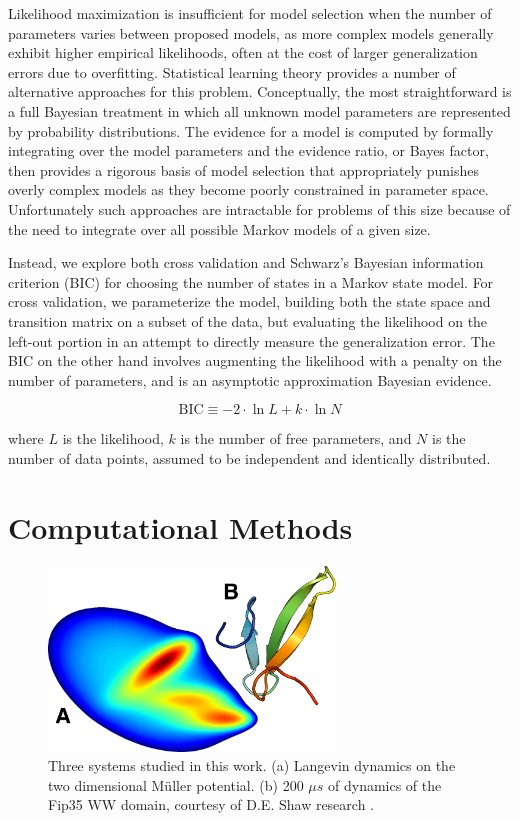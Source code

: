 \documentclass[twocolumn,floatfix,nofootinbib,aps]{revtex4-1}
\begin{document}
Likelihood maximization is insufficient for model selection when the number of parameters varies between proposed models, as more complex models generally exhibit higher empirical likelihoods, often at the cost of larger generalization errors due to overfitting\cite{Liddle2007Information, Hastie01Elements}. Statistical learning theory provides a number of alternative approaches for this problem. Conceptually, the most straightforward is a full Bayesian treatment in which all unknown model parameters are represented by probability distributions. The evidence for a model is computed by formally integrating over the model parameters and the evidence ratio, or Bayes factor\cite{Gelfand94Bayesian}, then provides a rigorous basis of model selection that appropriately punishes overly complex models as they become poorly constrained in parameter space. Unfortunately such approaches are intractable for problems of this size because of the need to integrate over all possible Markov models of a given size.

Instead, we explore both cross validation and Schwarz's Bayesian information criterion (BIC)\cite{Schwartz78Estimating} for choosing the number of states in a Markov state model. For cross validation, we parameterize the model, building both the state space and transition matrix on a subset of the data, but evaluating the likelihood on the left-out portion in an attempt to directly measure the generalization error. The BIC on the other hand involves augmenting the likelihood with a penalty on the number of parameters, and is
an asymptotic approximation Bayesian evidence.

\begin{equation}
\label{eq:bic}
\mathrm{BIC} \equiv -2\cdot \ln L + k \cdot \ln N
\end{equation}

where $L$ is the likelihood, $k$ is the number of free parameters, and $N$ is the number of data points, assumed to be independent and identically distributed.

\section{Computational Methods}

\begin{figure}
\centering
\includegraphics[width=3in]{figs/mull_ww.png}
\caption{Three systems studied in this work. (a) Langevin dynamics on the two dimensional M\"{u}ller potential. (b) 200 $\mu s$ of dynamics of the Fip35 WW domain\cite{Liu2008Experimental}, courtesy of D.E. Shaw research \cite{Shaw2010Atomic}.}
\end{figure}
\end{document}
